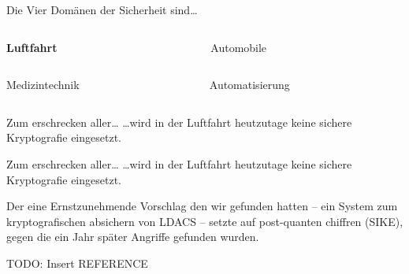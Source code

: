 
\begin{frame}{Die Vier Domänen der Sicherheit sind…}
  \begin{columns}[c]
    \begin{column}{.5\linewidth}
      \textbf{Luftfahrt}
    \end{column}
    \begin{column}{.5\linewidth}
      Automobile
    \end{column}
  \end{columns}
  \vfill
  \begin{columns}[c]
    \begin{column}{.5\linewidth}
      Medizintechnik
    \end{column}
    \begin{column}{.5\linewidth}
      Automatisierung
    \end{column}
  \end{columns}
\end{frame}


\begin{frame}[c]{Zum erschrecken aller…}
  \vspace{15em}
  \footnotesize
  …wird in der Luftfahrt heutzutage keine sichere Kryptografie eingesetzt. 
\end{frame}

\begin{frame}[c]{Zum erschrecken aller…}
  \vspace{10em}
  \footnotesize
  …wird in der Luftfahrt heutzutage keine sichere Kryptografie eingesetzt. 

  \vspace{1em}
  Der eine Ernstzunehmende Vorschlag den wir gefunden hatten -- ein System zum kryptografischen absichern von LDACS --
  setzte auf post-quanten chiffren (SIKE), gegen die ein Jahr später Angriffe gefunden wurden.

  \vspace{1em}
  TODO: Insert REFERENCE
\end{frame}

